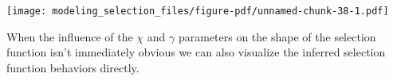 \documentclass[
  letterpaper,
  DIV=11,
  numbers=noendperiod]{scrartcl}
\newenvironment{Shaded}{\begin{snugshade}}{\end{snugshade}}
\newcommand{\AttributeTok}[1]{\textcolor[rgb]{0.40,0.45,0.13}{#1}}
\newcommand{\DecValTok}[1]{\textcolor[rgb]{0.68,0.00,0.00}{#1}}
\newcommand{\FloatTok}[1]{\textcolor[rgb]{0.68,0.00,0.00}{#1}}
\newcommand{\FunctionTok}[1]{\textcolor[rgb]{0.28,0.35,0.67}{#1}}
\newcommand{\NormalTok}[1]{\textcolor[rgb]{0.00,0.23,0.31}{#1}}
\newcommand{\SpecialCharTok}[1]{\textcolor[rgb]{0.37,0.37,0.37}{#1}}
\newcommand{\StringTok}[1]{\textcolor[rgb]{0.13,0.47,0.30}{#1}}
\begin{document}
\begin{Shaded}
\end{Shaded}

\texttt{[image: modeling\_selection\_files/figure-pdf/unnamed-chunk-38-1.pdf]}

When the influence of the \(\chi\) and \(\gamma\) parameters on the
shape of the selection function isn't immediately obvious we can also
visualize the inferred selection function behaviors directly.
\end{document}
